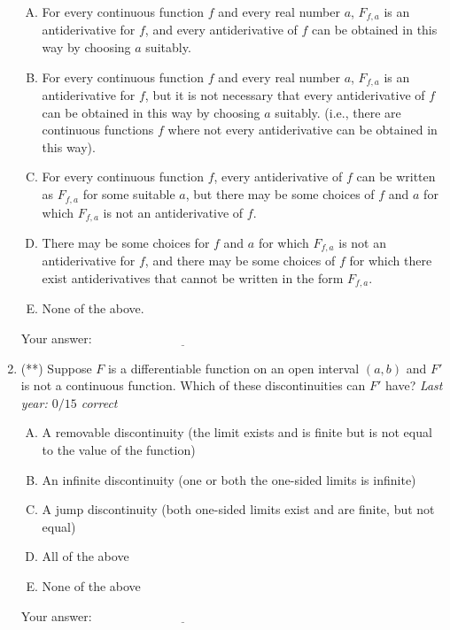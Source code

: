 \documentclass[10pt]{amsart}
\begin{document}
\begin{enumerate}
  \begin{enumerate}[(A)]
  \item For every continuous function $f$ and every real number $a$,
    $F_{f,a}$ is an antiderivative for $f$, and every antiderivative
    of $f$ can be obtained in this way by choosing $a$ suitably.
  \item For every continuous function $f$ and every real number $a$,
    $F_{f,a}$ is an antiderivative for $f$, but it is not necessary
    that every antiderivative of $f$ can be obtained in this way by
    choosing $a$ suitably. (i.e., there are continuous functions $f$
    where not every antiderivative can be obtained in this way).
  \item For every continuous function $f$, every antiderivative of $f$
    can be written as $F_{f,a}$ for some suitable $a$, but there may
    be some choices of $f$ and $a$ for which $F_{f,a}$ is not an
    antiderivative of $f$.
  \item There may be some choices for $f$ and $a$ for which $F_{f,a}$
    is not an antiderivative for $f$, and there may be some choices of
    $f$ for which there exist antiderivatives that cannot be written
    in the form $F_{f,a}$.
  \item None of the above.
  \end{enumerate}

  \vspace{0.1in}
  Your answer: $\underline{\qquad\qquad\qquad\qquad\qquad\qquad\qquad}$
  \vspace{1in}

\item (**) Suppose $F$ is a differentiable function on an open interval
  $(a,b)$ and $F'$ is not a continuous function. Which of these
  discontinuities can $F'$ have? {\em Last year: $0/15$ correct}

  \begin{enumerate}[(A)]
  \item A removable discontinuity (the limit exists and is finite but
    is not equal to the value of the function)
  \item An infinite discontinuity (one or both the one-sided limits is
    infinite)
  \item A jump discontinuity (both one-sided limits exist and are
    finite, but not equal)
  \item All of the above
  \item None of the above
  \end{enumerate}

  \vspace{0.1in}
  Your answer: $\underline{\qquad\qquad\qquad\qquad\qquad\qquad\qquad}$
  \vspace{1in}

\end{enumerate}
\end{document}
